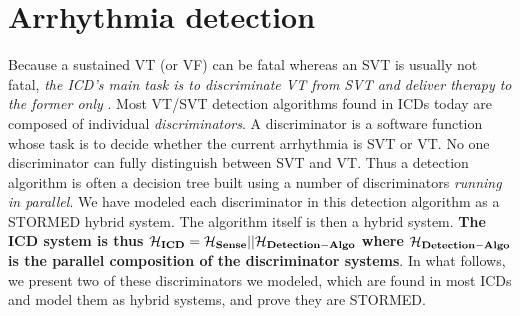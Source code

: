 \section{Arrhythmia detection}
\label{sec:discriminators}
Because a sustained \ac{VT} (or \ac{VF}) can be fatal whereas an \ac{SVT} is usually not fatal, 
\emph{the ICD's main task is to discriminate \ac{VT} from \ac{SVT} and deliver therapy to the former only} \cite{compass}.
Most \ac{VT}/\ac{SVT} detection algorithms found in ICDs today are composed of individual \emph{discriminators}. 
A discriminator is a software function whose task is to decide whether the current arrhythmia is \ac{SVT} or \ac{VT}.
No one discriminator can fully distinguish between SVT and VT.
Thus a detection algorithm is often a decision tree built using a number of discriminators \emph{running in parallel}.
We have modeled each discriminator in this detection algorithm as a STORMED hybrid system.
The algorithm itself is then a hybrid system.
\textbf{The ICD system is thus 
$\mathbf{\mathcal{H}_{ICD} = \mathcal{H}_{Sense}||\mathcal{H}_{Detection-Algo}}$ where $\mathbf{\mathcal{H}_{Detection-Algo}}$ is the parallel composition of the discriminator systems}.
In what follows, we present two of these discriminators we modeled, which are found in most ICDs and model them as hybrid systems, and prove they are STORMED.

%





